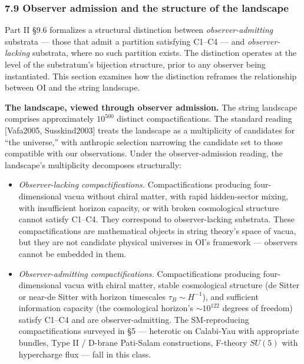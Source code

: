 \documentclass[
]{article}
\begin{document}
\hypertarget{observer-admission-and-the-structure-of-the-landscape}{%
\subsubsection{7.9 Observer admission and the structure of the
landscape}\label{observer-admission-and-the-structure-of-the-landscape}}

Part II §9.6 formalizes a structural distinction between
\emph{observer-admitting} substrata --- those that admit a partition
satisfying C1--C4 --- and \emph{observer-lacking} substrata, where no
such partition exists. The distinction operates at the level of the
substratum's bijection structure, prior to any observer being
instantiated. This section examines how the distinction reframes the
relationship between OI and the string landscape.

\textbf{The landscape, viewed through observer admission.} The string
landscape comprises approximately \(10^{500}\) distinct
compactifications. The standard reading {[}Vafa2005, Susskind2003{]}
treats the landscape as a multiplicity of candidates for ``the
universe,'' with anthropic selection narrowing the candidate set to
those compatible with our observations. Under the observer-admission
reading, the landscape's multiplicity decomposes structurally:

\begin{itemize}
\item
  \emph{Observer-lacking compactifications.} Compactifications producing
  four-dimensional vacua without chiral matter, with rapid hidden-sector
  mixing, with insufficient horizon capacity, or with broken
  cosmological structure cannot satisfy C1--C4. They correspond to
  observer-lacking substrata. These compactifications are mathematical
  objects in string theory's space of vacua, but they are not candidate
  physical universes in OI's framework --- observers cannot be embedded
  in them.
\item
  \emph{Observer-admitting compactifications.} Compactifications
  producing four-dimensional vacua with chiral matter, stable
  cosmological structure (de Sitter or near-de Sitter with horizon
  timescales \(\tau_B \sim H^{-1}\)), and sufficient information
  capacity (the cosmological horizon's \(\sim 10^{122}\) degrees of
  freedom) satisfy C1--C4 and are observer-admitting. The SM-reproducing
  compactifications surveyed in §5 --- heterotic on Calabi-Yau with
  appropriate bundles, Type II / D-brane Pati-Salam constructions,
  F-theory \(SU(5)\) with hypercharge flux --- fall in this class.
\end{itemize}
\end{document}
